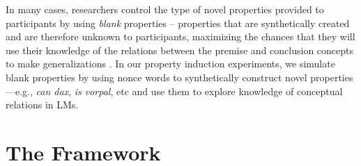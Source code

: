 \documentclass[10pt,letterpaper]{article}
\newcommand{\ake}[1]{\textcolor{blue}{$_{AE}$[#1]}}
\newcommand{\km}[1]{\textcolor{purple}{$_{KM}$[#1]}}
\newcounter{argument}
\begin{document}
In many cases, researchers control the type of novel properties provided to participants by using \textit{blank} properties -- properties that are synthetically created and are therefore unknown to participants, maximizing the chances that they will use their knowledge of the relations between the premise and conclusion concepts to make generalizations \citep{rips1975inductive, osherson1990category, murphy2004big}. In our property induction experiments, we simulate blank properties by using nonce words to synthetically construct novel properties---e.g., \textit{can dax}, \textit{is vorpal}, etc and use them to explore knowledge of conceptual relations in LMs.

\section{The Framework}

\end{document}
